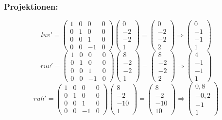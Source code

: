 \documentclass{article}
\begin{document}
\subsubsection*{Projektionen:}
\[
luv' = \begin{pmatrix}
        1&0&0&0\\
        0&1&0&0\\
        0&0&1&0\\
        0&0&-1&0
\end{pmatrix}
\begin{pmatrix}
        0\\-2\\-2\\1
\end{pmatrix}
=
\begin{pmatrix}
 0\\-2\\-2\\2
\end{pmatrix}
\Rightarrow
\begin{pmatrix}
 0\\-1\\-1\\1
\end{pmatrix}
\]
\[
ruv' = \begin{pmatrix}
        1&0&0&0\\
        0&1&0&0\\
        0&0&1&0\\
        0&0&-1&0
\end{pmatrix}
\begin{pmatrix}
        8\\-2\\-2\\1
\end{pmatrix}
=
\begin{pmatrix}
 8\\-2\\-2\\2
\end{pmatrix}
\Rightarrow
\begin{pmatrix}
 4\\-1\\-1\\1
\end{pmatrix}
\]
\[
ruh' = \begin{pmatrix}
        1&0&0&0\\
        0&1&0&0\\
        0&0&1&0\\
        0&0&-1&0
\end{pmatrix}
\begin{pmatrix}
        8\\-2\\-10\\1
\end{pmatrix}
=
\begin{pmatrix}
 8\\-2\\-10\\10
\end{pmatrix}
\Rightarrow
\begin{pmatrix}
 0,8\\-0,2\\-1\\1
\end{pmatrix}
\]
\end{document}
